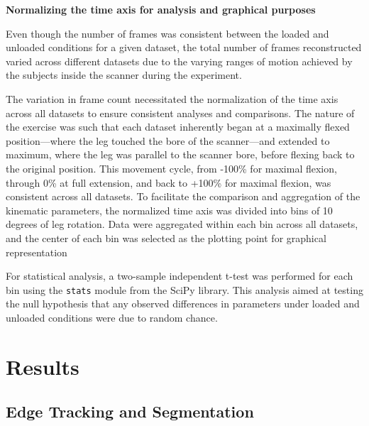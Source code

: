 \documentclass{micro-econ-thesis}
\begin{document}
\textbf{Normalizing the time axis for analysis and graphical purposes}

Even though the number of frames was consistent between the loaded and unloaded conditions for a given dataset, the total number of frames reconstructed varied across different datasets due to the varying ranges of motion achieved by the subjects inside the scanner during the experiment. 

The variation in frame count necessitated the normalization of the time axis across all datasets to ensure consistent analyses and comparisons. The nature of the exercise was such that each dataset inherently began at a maximally flexed position—where the leg touched the bore of the scanner—and extended to maximum, where the leg was parallel to the scanner bore, before flexing back to the original position. This movement cycle, from -100\% for maximal flexion, through 0\% at full extension, and back to +100\% for maximal flexion, was consistent across all datasets. To facilitate the comparison and aggregation of the kinematic parameters, the normalized time axis was divided into bins of 10 degrees of leg rotation. Data were aggregated within each bin across all datasets, and the center of each bin was selected as the plotting point for graphical representation

For statistical analysis, a two-sample independent t-test was performed for each bin using the \texttt{stats} module from the  SciPy library. This analysis aimed at testing the null hypothesis that any observed differences in parameters under loaded and unloaded conditions were due to random chance. 


\section{Results}
\label{sec:results}

\subsection{Edge Tracking and Segmentation}
\end{document}
